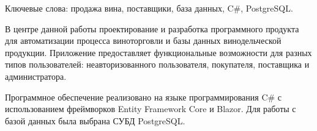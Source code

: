 \begin{essay}{}

Ключевые слова: продажа вина, поставщики, база данных, C\#, PostgreSQL.

В центре данной работы проектирование и разработка программного продукта для автоматизации процесса виноторговли и базы данных винодельческой продукции. Приложение предоставляет функциональные возможности для разных типов пользователей: неавторизованного пользователя, покупателя, поставщика и администратора.

Программное обеспечение реализовано на языке программирования C\# с использованием фреймворков Entity Framework Core и Blazor. Для работы с базой данных была выбрана СУБД PostgreSQL.

\end{essay}